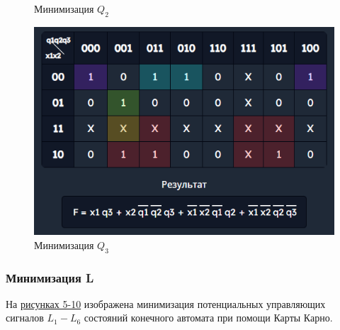 \documentclass[10pt,a4paper,final]{article} %
\begin{document}
\begin{figure}[htpb]
\begin{minipage}{0.3\textwidth}
		\caption{Минимизация $Q_2$}
	\end{minipage}
	\hfill
	\begin{minipage}{0.3\textwidth}
		\includegraphics[scale=0.45]{img/Q3.png}
		\caption{Минимизация $Q_3$}
	\end{minipage}
	\label{Q} 
\end{figure}


\subsubsection{Минимизация L}
На \hyperref[L]{рисунках 5-10} изображена минимизация потенциальных управляющих сигналов $L_1 - L_6$ состояний конечного автомата при помощи Карты Карно.
\end{document}
